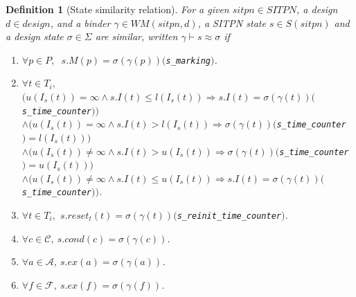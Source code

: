 \documentclass[pdflatex,sn-mathphys]{sn-jnl}%
\theoremstyle{thmstyleone}%
\theoremstyle{thmstyletwo}%
\theoremstyle{thmstylethree}%
\newtheorem{definition}{Definition}%
\begin{document}
\begin{definition}[State similarity relation]
  \label{def:state-sim}
  For a given $sitpn\in{}SITPN$, a \hvhdl{} design $d\in{}design$, and
  a binder $\gamma\in{}WM(sitpn,d)$, a SITPN state $s\in{}S(sitpn)$
  and a design state $\sigma\in\Sigma$ are similar, written
  $\gamma\vdash{}s\approx\sigma$ if
  \begin{enumerate}
  \item\label{item:sim-mark} $\forall{}p\in{}P,$
    $~s.M(p)=\sigma(\gamma(p))($\texttt{s\_marking}$)$.
  \item\label{item:sim-tc}
    $\forall{}t\in{}T_i,$\\
    $\big(u(I_s(t))=\infty\land{}s.I(t)\le{}l(I_s(t))\Rightarrow{}s.I(t)=\sigma(\gamma(t))($\texttt{s\_time\_counter}$)\big)$\\
    $\land\big(u(I_s(t))=\infty\land{}s.I(t)>{}l(I_s(t))\Rightarrow{}\sigma(\gamma(t))($\texttt{s\_time\_counter}$)=l(I_s(t))\big)$\\
    $\land\big(u(I_s(t))\neq\infty\land{}s.I(t)>{}u(I_s(t))\Rightarrow{}\sigma(\gamma(t))($\texttt{s\_time\_counter}$)=u(I_s(t))\big)$\\
    $\land\big(u(I_s(t))\neq\infty\land{}s.I(t)\le{}u(I_s(t))\Rightarrow{}s.I(t)=\sigma(\gamma(t))($\texttt{s\_time\_counter}$)\big)$.
  \item\label{item:sim-reset} $\forall{}t\in{}T_i,$
    $s.reset_t(t)=\sigma(\gamma(t))($\texttt{s\_reinit\_time\_counter}$)$.
  \item\label{item:sim-cond}
    $\forall{}c\in\mathcal{C},~s.cond(c)=\sigma(\gamma(c))$.
  \item\label{item:sim-act}
    $\forall{}a\in\mathcal{A},~s.ex(a)=\sigma(\gamma(a))$.
  \item\label{item:sim-fun}
    $\forall{}f\in\mathcal{F},~s.ex(f)=\sigma(\gamma(f))$.
  \end{enumerate}
\end{definition}
\end{document}
